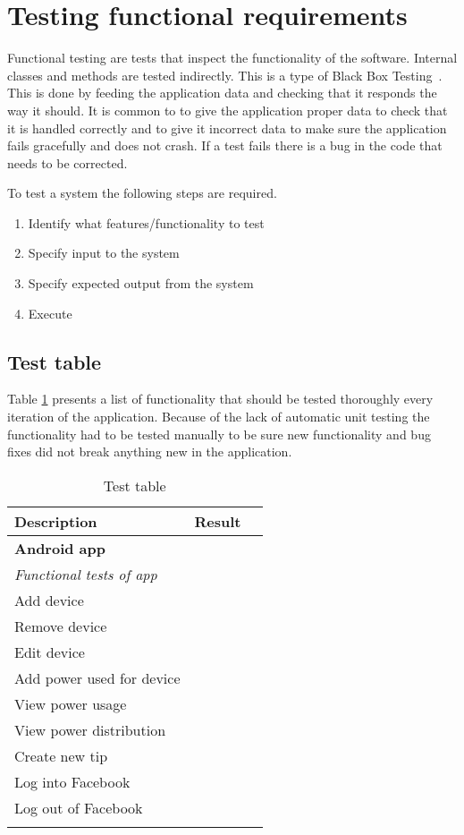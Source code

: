 \section{Testing functional requirements}
\label{sec:funcTest}
Functional testing are tests that inspect the functionality of the software. Internal classes and methods are tested indirectly. This is a type of Black Box Testing~\cite{blackbox}. This is done by feeding the application data and checking that it responds the way it should. It is common to to give the application proper data to check that it is handled correctly and to give it incorrect data to make sure the application fails gracefully and does not crash. If a test fails there is a bug in the code that needs to be corrected.

To test a system the following steps are required.
\begin{enumerate}
\item Identify what features/functionality to test
\item Specify input to the system
\item Specify expected output from the system
\item Execute
\end{enumerate}

\subsection{Test table}
Table \ref{tab:testTable} presents a list of functionality that should be tested thoroughly every iteration of the application. Because of the lack of automatic unit testing the functionality had to be tested manually to be sure new functionality and bug fixes did not break anything new in the application.

\begin{table}[H]
\begin{tabular}{|l|l|l|}
\hline
\rowcolor{darkgray}\textbf{Description} & \textbf{Result}\\\hline \arrayrulecolor{lightgray}
\rowcolors{0}{darkgray}{lightgray}
\textbf{Android app}&\\ \cline{1-2}\cline{2-3}
\textit{Functional tests of app} &  \\ \cline{1-2}\cline{2-3}
Add device&\\ \cline{1-2}\cline{2-3}
Remove device&\\ \cline{1-2}\cline{2-3}
Edit device&\\ \cline{1-2}\cline{2-3}
Add power used for device&\\ \cline{1-2}\cline{2-3}
View power usage&\\ \cline{1-2}\cline{2-3}
View power distribution&\\ \cline{1-2}\cline{2-3}
Create new tip&\\ \cline{1-2}\cline{2-3}
Log into Facebook&\\ \cline{1-2}\cline{2-3}
Log out of Facebook&\\\arrayrulecolor{black}
\hline
\end{tabular}
\caption{Test table}
\label{tab:testTable}
\end{table}

